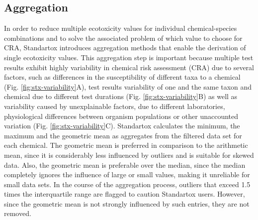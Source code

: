 \subsection{Aggregation}
In order to reduce multiple ecotoxicity values for individual chemical-species combinations and to solve the associated problem of which value to choose for CRA, Standartox introduces aggregation methods that enable the derivation of single ecotoxicity values. This aggregation step is important because multiple test results exhibit highly variability in chemical risk assessment (CRA) due to several factors, such as differences in the susceptibility of different taxa to a chemical (Fig. \ref{fig:stx-variability}A), test results variability of one and the same taxon and chemical due to different test durations (Fig. \ref{fig:stx-variability}B) as well as variability caused by unexplainable factors, due to different laboratories, physiological differences between organism populations or other unaccounted variation (Fig. \ref{fig:stx-variability}C). Standartox calculates the minimum, the maximum and the geometric mean as aggregates from the filtered data set for each chemical. The geometric mean is preferred in comparison to the arithmetic mean, since it is considerably less influenced by outliers and is suitable for skewed data. Also, the geometric mean is preferable over the median, since the median completely ignores the influence of large or small values, making it unreliable for small data sets. In the course of the aggregation process, outliers that exceed 1.5 times the interquartile range are flagged to caution Standartox users. However, since the geometric mean is not strongly influenced by such entries, they are not removed.

